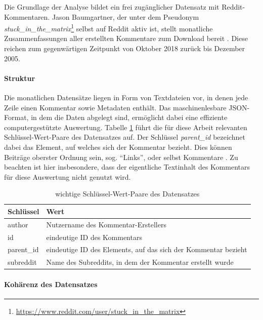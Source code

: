 \documentclass[11pt,a4paper,twoside]{article}
\let\rmarkdownfootnote\footnote%
\def\footnote{\protect\rmarkdownfootnote}
\let\oldpar\paragraph
\renewcommand{\paragraph}{\oldpar*}
\begin{document}
Die Grundlage der Analyse bildet ein frei zugänglicher Datensatz mit
Reddit-Kommentaren. Jason Baumgartner, der unter dem Pseudonym
\emph{stuck\_in\_the\_matrix}\footnote{\url{https://www.reddit.com/user/stuck_in_the_matrix}}
selbst auf Reddit aktiv ist, stellt monatliche Zusammenfassungen aller
erstellten Kommentare zum Download bereit \autocite{Baumgartner}. Diese
reichen zum gegenwärtigen Zeitpunkt von Oktober 2018 zurück bis Dezember
2005.

\hypertarget{struktur}{%
\paragraph{Struktur}\label{struktur}}

Die monatlichen Datensätze liegen in Form von Textdateien vor, in denen
jede Zeile einen Kommentar sowie Metadaten enthält. Das maschinenlesbare
JSON-Format, in dem die Daten abgelegt sind, ermöglicht dabei eine
effiziente computergestützte Auswertung. Tabelle \ref{tab:importantkeys}
führt die für diese Arbeit relevanten Schlüssel-Wert-Paare des
Datensatzes auf. Der Schlüssel \emph{parent\_id} bezeichnet dabei das
Element, auf welches sich der Kommentar bezieht. Dies können Beiträge
oberster Ordnung sein, sog. \enquote{Links}, oder selbst Kommentare
\autocite{Reddit2018}. Zu beachten ist hier insbesondere, dass der
eigentliche Textinhalt des Kommentars für diese Auswertung nicht genutzt
wird.

\begin{table}

\caption{\label{tab:importantkeys}wichtige Schlüssel-Wert-Paare des Datensatzes}
\centering
\begin{tabular}[t]{ll}
\toprule
Schlüssel & Wert\\
\midrule
author & Nutzername des Kommentar-Erstellers\\
id & eindeutige ID des Kommentars\\
parent\_id & eindeutige ID des Elements, auf das sich der Kommentar bezieht\\
subreddit & Name des Subreddits, in dem der Kommentar erstellt wurde\\
\bottomrule
\end{tabular}
\end{table}

\hypertarget{koharenz-des-datensatzes}{%
\paragraph{Kohärenz des Datensatzes}\label{koharenz-des-datensatzes}}
\end{document}
